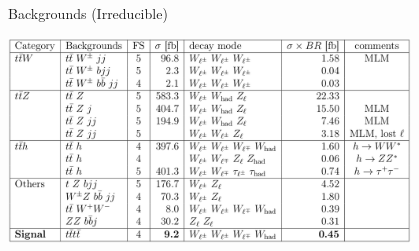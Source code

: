 
\begin{frame}{Backgrounds (Irreducible)}
  \begin{center}
    \includegraphics[width=0.8\textwidth]{figures/irreducible-backgrounds}
  \end{center}
\end{frame}
